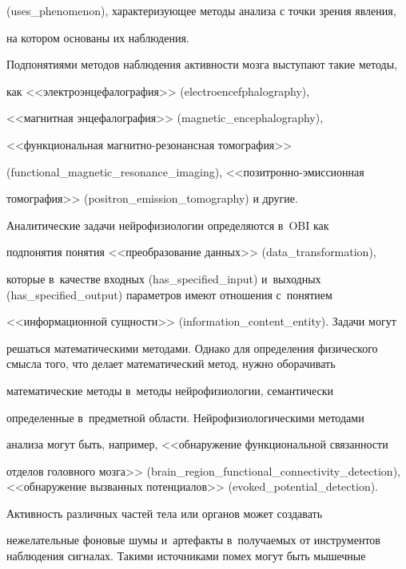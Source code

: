 (uses\_phenomenon), характеризующее методы анализа с точки зрения явления, 

на котором основаны их наблюдения.

      

      Подпонятиями методов наблюдения активности мозга выступают такие методы, 

      как <<электроэнцефалография>> (electroencefphalography), 

<<магнитная энцефалография>> (magnetic\_encephalography), 

<<функциональная маг\-нит\-но-ре\-зо\-нанс\-ная томография>> 

(functional\_magnetic\_resonance\_imaging), <<по\-зит\-рон\-но-эмис\-си\-он\-ная

 томография>> (positron\_emission\_tomography) и другие.

      

      Аналитические задачи нейрофизиологии определяются в~OBI как

 подпонятия понятия <<преобразование данных>> (data\_transformation), 

которые в~ка\-че\-ст\-ве входных (has\_specified\_input) и~выходных (has\_specified\_output) па\-ра\-мет\-ров имеют отношения с~понятием 

<<информационной сущности>> (\mbox{information}\_content\_entity). Задачи могут

 решаться математическими методами. Однако для определения физического смысла того, что делает математический метод, нужно оборачивать

 математические методы в~методы нейрофизиологии, семантически 

определенные в~предметной об\-ласти. Нейрофизиологическими методами 

анализа могут быть, например, <<обнаружение функциональной связанности 

отделов головного мозга>> (brain\_region\_functional\_connectivity\_detection), <<обнаружение вызванных потенциалов>> (evoked\_potential\_detection).

{



}

      

      Активность различных частей тела или органов может создавать 

нежелательные фоновые шумы и~артефакты в~получаемых от инструментов наблюдения сигналах. Такими источниками помех могут быть мышечные


